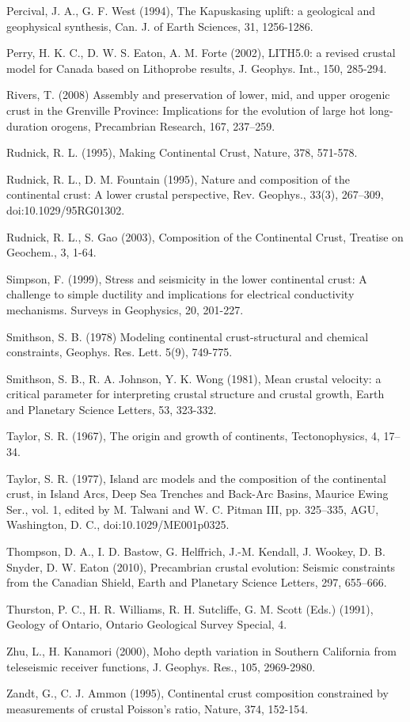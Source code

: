 \documentclass[msc,oneside]{ubcthesis}
\begin{document}
\begin{thebibliography}{1}
\bibitem{} Percival, J. A., G. F. West (1994), The Kapuskasing uplift: a geological and geophysical synthesis, Can. J. of Earth Sciences, 31, 1256-1286.

\bibitem{} Perry, H. K. C., D. W. S. Eaton, A. M. Forte (2002), LITH5.0: a revised crustal model for Canada based on Lithoprobe results,  J. Geophys. Int., 150, 285-294.

\bibitem{} Rivers, T. (2008) Assembly and preservation of lower, mid, and upper orogenic crust in the Grenville Province: Implications for the evolution of large hot long-duration orogens, Precambrian Research, 167, 237–259.

\bibitem{} Rudnick, R. L. (1995), Making Continental Crust, Nature, 378, 571-578.

\bibitem{} Rudnick, R. L., D. M. Fountain (1995), Nature and composition of the continental crust: A lower crustal perspective, Rev. Geophys., 33(3), 267–309, doi:10.1029/95RG01302.

\bibitem{} Rudnick, R. L., S. Gao (2003), Composition of the Continental Crust, Treatise on Geochem., 3, 1-64.

\bibitem{} Simpson, F. (1999), Stress and seismicity in the lower continental crust: A challenge to simple ductility and implications for electrical conductivity mechanisms. Surveys in Geophysics, 20, 201-227.

\bibitem{} Smithson, S. B. (1978) Modeling continental crust-structural and chemical constraints, Geophys. Res. Lett. 5(9), 749-775.

\bibitem{} Smithson, S. B., R. A. Johnson, Y. K. Wong (1981), Mean crustal velocity: a critical parameter for interpreting crustal structure and crustal growth, Earth and Planetary Science Letters, 53, 323-332.

\bibitem{} Taylor, S. R. (1967), The origin and growth of continents, Tectonophysics, 4, 17–34.

\bibitem{} Taylor, S. R. (1977), Island arc models and the composition of the continental crust, in Island Arcs, Deep Sea Trenches and Back-Arc Basins, Maurice Ewing Ser., vol. 1, edited by M. Talwani and W. C. Pitman III, pp. 325–335, AGU, Washington, D. C., doi:10.1029/ME001p0325.

\bibitem{} Thompson, D. A., I. D. Bastow, G. Helffrich, J.-M. Kendall, J. Wookey, D. B. Snyder, D. W. Eaton (2010), Precambrian crustal evolution: Seismic constraints from the Canadian Shield, Earth and Planetary Science Letters, 297, 655–666.

\bibitem{} Thurston, P. C., H. R. Williams, R. H. Sutcliffe, G. M. Scott (Eds.) (1991), Geology of Ontario, Ontario Geological Survey Special, 4.

\bibitem{} Zhu, L., H. Kanamori (2000), Moho depth variation in Southern California from teleseismic receiver functions, J. Geophys. Res., 105, 2969-2980.

\bibitem{} Zandt, G., C. J. Ammon (1995), Continental crust composition constrained by measurements of crustal Poisson's ratio, Nature, 374, 152-154.

\end{thebibliography}
\end{document}
